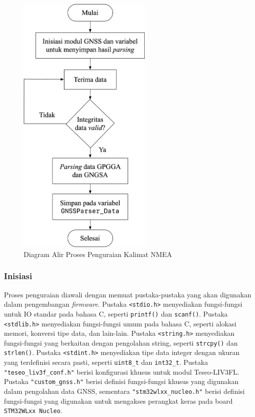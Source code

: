 \begin{figure}[H]
	\centering
	\includegraphics[width=6.5cm]{contents/chapter-3/diagram-parser.png}
	\caption{Diagram Alir Proses Penguraian Kalimat NMEA}
	\label{Fig: flowchart-parsing}
\end{figure}

\subsubsection{Inisiasi}
Proses penguraian diawali dengan memuat pustaka-pustaka yang akan digunakan dalam pengembangan \textit{firmware}. Pustaka \texttt{<stdio.h>} menyediakan fungsi-fungsi untuk IO standar pada bahasa C, seperti \texttt{printf()} dan \texttt{scanf()}. Pustaka \texttt{<stdlib.h>} menyediakan fungsi-fungsi umum pada bahasa C, seperti alokasi memori, konversi tipe data, dan lain-lain. Pustaka \texttt{<string.h>} menyediakan fungsi-fungsi yang berkaitan dengan pengolahan string, seperti \texttt{strcpy()} dan \texttt{strlen()}. Pustaka \texttt{<stdint.h>} menyediakan tipe data integer dengan ukuran yang terdefinisi secara pasti, seperti \texttt{uint8\_t} dan \texttt{int32\_t}. Pustaka \texttt{"teseo\_liv3f\_conf.h"} berisi konfigurasi khusus untuk modul Teseo-LIV3FL. Pustaka \texttt{"custom\_gnss.h"} berisi definisi fungsi-fungsi khusus yang digunakan dalam pengolahan data GNSS, sementara \texttt{"stm32wlxx\_nucleo.h"} berisi definisi fungsi-fungsi yang digunakan untuk mengakses perangkat keras pada board \texttt{STM32WLxx Nucleo}.

